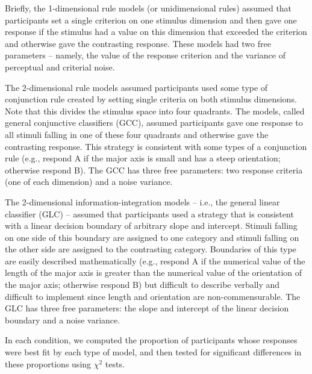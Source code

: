 \documentclass[doc, floatsintext]{apa7}
\begin{document}
Briefly, the 1-dimensional rule models (or unidimensional
rules) assumed that participants set a single criterion on
one stimulus dimension and then gave one response if the
stimulus had a value on this dimension that exceeded the
criterion and otherwise gave the contrasting response. These
models had two free parameters -- namely, the value of the
response criterion and the variance of perceptual and
criterial noise.

The 2-dimensional rule models assumed participants used some
type of conjunction rule created by setting single criteria
on both stimulus dimensions. Note that this divides the
stimulus space into four quadrants. The models, called
general conjunctive classifiers (GCC), assumed participants
gave one response to all stimuli falling in one of these
four quadrants and otherwise gave the contrasting response.
This strategy is consistent with some types of a conjunction
rule (e.g., respond A if the major axis is small and has a
steep orientation; otherwise respond B). The GCC has three
free parameters: two response criteria (one of each
dimension) and a noise variance.

The 2-dimensional information-integration models -- i.e.,
the general linear classifier (GLC) -- assumed that
participants used a strategy that is consistent with a
linear decision boundary of arbitrary slope and intercept.
Stimuli falling on one side of this boundary are assigned to
one category and stimuli falling on the other side are
assigned to the contrasting category. Boundaries of this
type are easily described mathematically (e.g., respond A if
the numerical value of the length of the major axis is
greater than the numerical value of the orientation of the
major axis; otherwise respond B) but difficult to describe
verbally and difficult to implement since length and
orientation are non-commensurable. The GLC has three free
parameters: the slope and intercept of the linear decision
boundary and a noise variance.

In each condition, we computed the proportion of
participants whose responses were best fit by each type of
model, and then tested for significant differences in these
proportions using $\chi^2$ tests.
\end{document}
